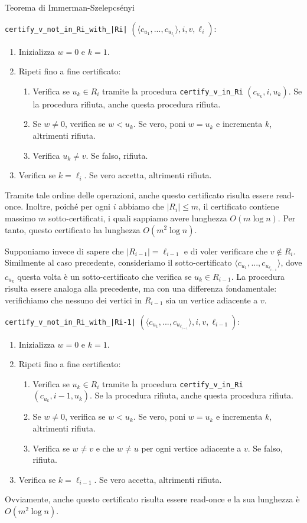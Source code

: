 \begin{Thm}{Teorema di Immerman-Szelepcsényi}{}
\begin{demonstration}
\texttt{certify\_v\_not\_in\_Ri\_with\_|Ri|} $(\langle c_{u_1},..., c_{u_{\ell_i}}\rangle, i, v, \ell_i)$:
\begin{enumerate}
    \item Inizializza $w = 0$ e $k = 1$.
    \item Ripeti fino a fine certificato:
    \begin{enumerate}
        \item Verifica se $u_k\in R_i$ tramite la procedura \texttt{certify\_v\_in\_Ri} $(c_{u_k}, i, u_k)$. Se la procedura rifiuta, anche questa procedura rifiuta.
        \item Se $w\neq 0$, verifica se $w < u_k$. Se vero, poni $w = u_k$ e incrementa $k$, altrimenti rifiuta.
        \item Verifica $u_k\neq v$. Se falso, rifiuta.
    \end{enumerate}
    \item Verifica se $k = \ell_i$. Se vero accetta, altrimenti rifiuta.
\end{enumerate}
Tramite tale ordine delle operazioni, anche questo certificato risulta essere read-once. Inoltre, poiché per ogni $i$ abbiamo che $|R_i|\leq m$, il certificato contiene massimo $m$ sotto-certificati, i quali sappiamo avere lunghezza $O(m\log n)$. Per tanto, questo certificato ha lunghezza $O(m^2\log n)$.

Supponiamo invece di sapere che $|R_{i-1}| = \ell_{i-1}$ e di voler verificare che $v\notin R_i$. Similmente al caso precedente, consideriamo il sotto-certificato $\langle c_{u_1},...,c_{u_{\ell_{i-1}}}\rangle$, dove $c_{u_k}$ questa volta è un sotto-certificato che verifica se $u_k\in R_{i-1}$. La procedura risulta essere analoga alla precedente, ma con una differenza fondamentale: verifichiamo che nessuno dei vertici in $R_{i-1}$ sia un vertice adiacente a $v$.

\texttt{certify\_v\_not\_in\_Ri\_with\_|Ri-1|} $(\langle c_{u_1},..., c_{u_{\ell_{i-1}}}\rangle, i, v, \ell_{i-1})$:
\begin{enumerate}
    \item Inizializza $w = 0$ e $k = 1$.
    \item Ripeti fino a fine certificato:
    \begin{enumerate}
        \item Verifica se $u_k\in R_i$ tramite la procedura \texttt{certify\_v\_in\_Ri} $(c_{u_k}, i-1, u_k)$.
        Se la procedura rifiuta, anche questa procedura rifiuta.
        \item Se $w\neq 0$, verifica se $w < u_k$. Se vero, poni $w = u_k$ e incrementa $k$, altrimenti rifiuta.
        \item Verifica se $w\neq v$ e che $w\neq u$ per ogni vertice adiacente a $v$. Se falso, rifiuta.
    \end{enumerate}
    \item Verifica se $k = \ell_{i-1}$. Se vero accetta, altrimenti rifiuta.
\end{enumerate}
Ovviamente, anche questo certificato risulta essere read-once e la sua lunghezza è $O(m^2\log n)$.


\end{demonstration}
\end{Thm}
